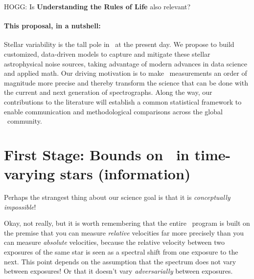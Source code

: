 \documentclass[12pt, letterpaper]{article}
\begin{document}
HOGG: Is \textbf{Understanding the Rules of Life} also relevant?

\paragraph{This proposal, in a nutshell:}
Stellar variability is the tall pole in \EPRV\ at the present day.
We propose to build customized, data-driven models to capture and mitigate these
stellar astrophysical noise sources, taking advantage of modern advances in
data science and applied math.
Our driving motivation is to make \EPRV\ measurements an order of magnitude more precise
and thereby transform the science
that can be done with the current and next generation of spectrographs. 
Along the way, our contributions to the literature will 
establish a common statistical framework to enable communication 
and methodological comparisons across the global \EPRV\ community. 

\section{First Stage: Bounds on \EPRV\ in time-varying stars (information)}

Perhaps the strangest thing about our science goal is that
it is \emph{conceptually impossible}!

Okay, not really, but it is worth remembering that the entire
\EPRV\ program is built on the premise that you can measure
\emph{relative} velocities far more precisely than you can measure
\emph{absolute} velocities, because the relative velocity between two
exposures of the same star is seen as a spectral shift from one
exposure to the next.
This point depends on the assumption that the spectrum does not vary
between exposures!
Or that it doesn't vary \emph{adversarially} between exposures.
\end{document}
